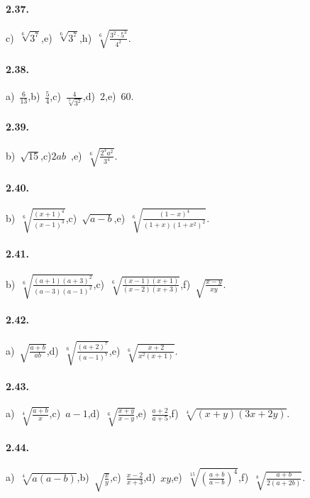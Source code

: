 \paragraph{2.37.}
c)~$\sqrt[6]{3^7}$,\quad e)~$\sqrt[6]{3^7}$,\quad h)~$\sqrt[6]{\frac{3^2\cdot 5^3}{4^2}}$.

\paragraph{2.38.}
a)~$\frac{6}{13}$,\quad b)~$\frac 5 4$,\quad c)~$\frac{4}{\sqrt[3]{3^2}}$,\quad d)~$2$,\quad e)~$60$.

\paragraph{2.39.}
b)~$\sqrt{15}$,\quad c)$2ab$~,\quad e)~$\sqrt[6]{\frac{2^3a^2}{3^4}}$.

\paragraph{2.40.}
b)~$\sqrt[6]{\frac{(x+1)^4}{(x-1)^3}}$,\quad c)~$\sqrt{a-b}$,\quad e)~$\sqrt[6]{\frac{(1-x)^4}{(1+x)(1+x^2)^2}}$.

\paragraph{2.41.}
b)~$\sqrt[6]{\frac{(a+1)(a+3)^2}{(a-3)(a-1)^2}}$,\quad c)~$\sqrt[6]{\frac{(x-1)(x+1)}{(x-2)(x+3)}}$,\quad f)~$\sqrt{\frac{x-y}{xy}}$.

\paragraph{2.42.}
a)~$\sqrt{\frac{a+b}{ab}}$,\quad d)~$\sqrt[6]{\frac{(a+2)^7}{(a-1)^7}}$,\quad e)~$\sqrt[6]{\frac{x+2}{x^2(x+1)}}$.

\paragraph{2.43.}
a)~$\sqrt[4]{\frac{a+b} x}$,\quad c)~$a-1$,\quad d)~$\sqrt[6]{\frac{x+y}{x-y}}$,\quad e)~$\frac{a+2}{a+5}$,\quad f)~$\sqrt[4]{(x+y)(3x+2y)}$.

\paragraph{2.44.}
a)~$\sqrt[4]{a(a-b)}$,\quad b)~$\sqrt{\frac{x}{y}}$,\quad c)~$\frac{x-2}{x+3}$,\quad d)~$xy$,\quad e)~$\sqrt[15]{\left(\frac{a+b}{a-b}\right)^4}$,\quad f)~$\sqrt[8]{\frac{a+b}{2(a+2b)}}$.

